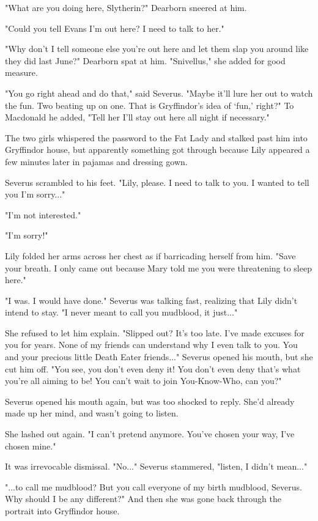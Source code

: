 "What are you doing here, Slytherin?" Dearborn sneered at him.

"Could you tell Evans I'm out here? I need to talk to her."

"Why don't I tell someone else you're out here and let them slap you around like they did last June?" Dearborn spat at him. "Snivellus," she added for good measure.

"You go right ahead and do that," said Severus. "Maybe it'll lure her out to watch the fun. Two beating up on one. That is Gryffindor's idea of `fun,' right?" To Macdonald he added, "Tell her I'll stay out here all night if necessary."

The two girls whispered the password to the Fat Lady and stalked past him into Gryffindor house, but apparently something got through because Lily appeared a few minutes later in pajamas and dressing gown.

Severus scrambled to his feet. "Lily, please. I need to talk to you. I wanted to tell you I'm sorry..."

"I'm not interested."

"I'm sorry!"

Lily folded her arms across her chest as if barricading herself from him. "Save your breath. I only came out because Mary told me you were threatening to sleep here."

"I was. I would have done." Severus was talking fast, realizing that Lily didn't intend to stay. "I never meant to call you mudblood, it just..."

She refused to let him explain. "Slipped out? It's too late. I've made excuses for you for years. None of my friends can understand why I even talk to you. You and your precious little Death Eater friends..." Severus opened his mouth, but she cut him off. "You see, you don't even deny it! You don't even deny that's what you're all aiming to be! You can't wait to join You-Know-Who, can you?"

Severus opened his mouth again, but was too shocked to reply. She'd already made up her mind, and wasn't going to listen.

She lashed out again. "I can't pretend anymore. You've chosen your way, I've chosen mine."

It was irrevocable dismissal. "No..." Severus stammered, "listen, I didn't mean..."

"...to call me mudblood? But you call everyone of my birth mudblood, Severus. Why should I be any different?" And then she was gone back through the portrait into Gryffindor house.

